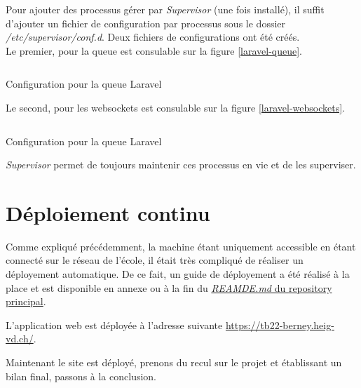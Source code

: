 \documentclass[
    iai, %
    il, %
]{heig-tb}
\begin{document}
Pour ajouter des processus gérer par \emph{Supervisor} (une fois installé), il suffit d'ajouter un fichier de configuration par processus sous le dossier \emph{/etc/supervisor/conf.d}. Deux fichiers de configurations ont été créés. \\
Le premier, pour la queue est consulable sur la figure \ref{laravel-queue}.

\begin{listing}[h]
    \inputminted{configuration}{assets/code/laravel-queue.conf}
    \caption{Configuration pour la queue Laravel \label{laravel-queue}}
\end{listing}

Le second, pour les \Gls{websockets} est consulable sur la figure \ref{laravel-websockets}.

\begin{listing}[h]
    \inputminted{configuration}{assets/code/laravel-websockets.conf}
    \caption{Configuration pour la queue Laravel \label{laravel-websockets}}
\end{listing}

\emph{Supervisor} permet de toujours maintenir ces processus en vie et de les superviser.

\section{Déploiement continu}
Comme expliqué précédemment, la machine étant uniquement accessible en étant connecté sur le réseau de l'école, il était très compliqué de réaliser un déployement automatique.
De ce fait, un guide de déployement a été réalisé à la place et est disponible en annexe ou à la fin du \href{https://github.com/heig-fablab/fablab-manager/blob/main/README.md}{\emph{REAMDE.md} du \Gls{repository} principal}.

L'application web est déployée à l'adresse suivante \href{https://tb22-berney.heig-vd.ch/}{https://tb22-berney.heig-vd.ch/}.

Maintenant le site est  déployé, prenons du recul sur le projet et établissant un bilan final, passons à la conclusion.



\end{document}
